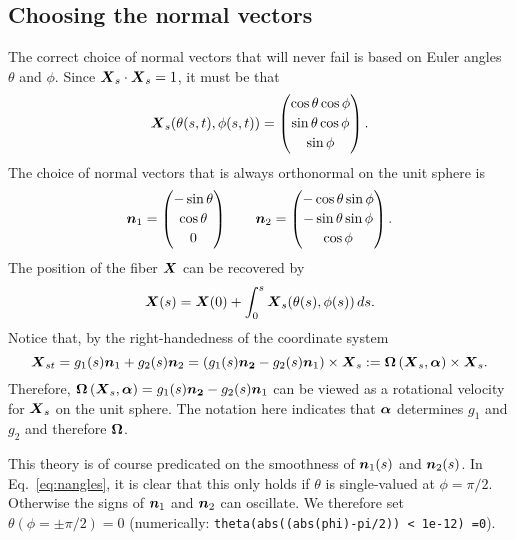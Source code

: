 \subsection{Choosing the normal vectors}
The correct choice of normal vectors that will never fail is based on Euler angles $\theta$ and $\phi$. Since $\boldsymbol{X}_s \cdot \boldsymbol{X}_s=1$, it must be that
\begin{equation}
\boldsymbol{X}_s(\theta(s,t),\phi(s,t)) = \begin{pmatrix} \cos{\theta} \cos{\phi}\\[2 pt] \sin{\theta} \cos{\phi} \\[2 pt] \sin{\phi} \end{pmatrix}.
\end{equation}
The choice of normal vectors that is always orthonormal on the unit sphere is
\begin{equation}
\label{eq:nangles}
\boldsymbol{n}_1 =  \begin{pmatrix} -\sin{\theta}\\[2 pt] \cos{\theta}\\[2 pt]0 \end{pmatrix} \qquad \boldsymbol{n}_2 =  \begin{pmatrix} -\cos{\theta} \sin{\phi}\\[2 pt] -\sin{\theta} \sin{\phi} \\[2 pt] \cos{\phi} \end{pmatrix}. 
\end{equation}
The position of the fiber $\boldsymbol{X}$ can be recovered by 
\begin{equation}
\label{eq:XfromXs}
\boldsymbol{X}(s)= \boldsymbol{X}(0)+\int_0^s \boldsymbol{X}_s(\theta(s),\phi(s)) \, ds. 
\end{equation}
Notice that, by the right-handedness of the coordinate system
\begin{equation}
\label{eq:Xsupdate}
\boldsymbol{X}_{st} = g_1(s)\boldsymbol{n}_1 + g_2(s) \boldsymbol{n}_2 = \left(g_1(s)\boldsymbol{n_2}-g_2(s)\boldsymbol{n}_1\right) \times \boldsymbol{X}_s:=\boldsymbol{\Omega}\left(\boldsymbol{X}_s, \boldsymbol{\alpha}\right) \times \boldsymbol{X}_s. 
\end{equation}
Therefore, $\boldsymbol{\Omega}\left(\boldsymbol{X}_s, \boldsymbol{\alpha}\right)=g_1(s)\boldsymbol{n_2}-g_2(s)\boldsymbol{n}_1$ can be viewed as a rotational velocity for $\boldsymbol{X}_s$ on the unit sphere. The notation here indicates that $\boldsymbol{\alpha}$ determines $g_1$ and $g_2$ and therefore $\boldsymbol{\Omega}$.

This theory is of course predicated on the smoothness of $\boldsymbol{n}_1(s)$ and $\boldsymbol{n}_2(s)$. In Eq.\ \eqref{eq:nangles}, it is clear that this only holds if $\theta$ is single-valued at $\phi=\pi/2$. Otherwise the signs of $\boldsymbol{n}_1$ and $\boldsymbol{n}_2$ can oscillate. We therefore set $\theta \left(\phi=\pm \pi/2\right)=0$ (numerically: \texttt{theta(abs((abs(phi)-pi/2)) < 1e-12) =0}). 